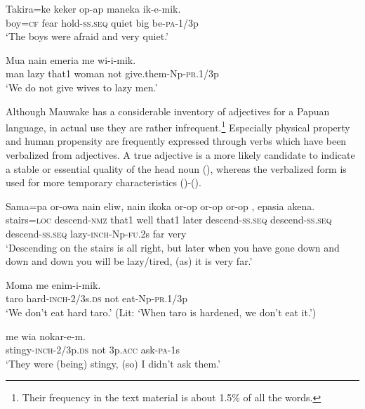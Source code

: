 \ea%
\label{ex:x1757}
\gll Takira=ke keker op-ap  maneka ik-e-mik. \\
boy=\textsc{cf} fear hold-\textsc{ss}.\textsc{seq} quiet big be-\textsc{pa}-1/3p\\
\glt`The boys were afraid and very quiet.'
\z

\ea%
\label{ex:x1418}
\gll Mua  nain emeria me wi-i-mik. \\
man lazy that1 woman not give.them-Np-\textsc{pr}.1/3p\\
\glt`We do not give wives to lazy men.'
\z

Although Mauwake has a considerable inventory of adjectives for a Papuan language, in actual use they are rather infrequent.\footnote{Their frequency in the text material is about 1.5\% of all the words.} Especially physical property and human propensity are frequently expressed through verbs which have been verbalized from adjectives. A true adjective is a more likely candidate to indicate a stable or essential quality of the head noun (), whereas the verbalized form is used for more temporary characteristics ()-().

\ea%
\label{ex:x1419}
\gll Sama=pa or-owa nain eliw, nain ikoka or-op or-op or-op , epasia akena.\\
stairs=\textsc{loc} descend-\textsc{nmz} that1 well that1 later descend-\textsc{ss}.\textsc{seq} descend-\textsc{ss}.\textsc{seq} descend-\textsc{ss}.\textsc{seq} lazy-\textsc{inch}-Np-\textsc{fu}.2s far very\\
\glt`Descending on the stairs is all right, but later when you have gone down and down and down you will be lazy/tired, (as) it is very far.'
\z

\ea%
\label{ex:x79}
\gll Moma   me enim-i-mik. \\
taro hard-\textsc{inch}-2/3s.\textsc{ds} not eat-Np-\textsc{pr}.1/3p\\
\glt`We don't eat hard taro.' (Lit: `When taro is hardened, we don't eat it.')
\z

\ea%
\label{ex:x80}
\gll {} me wia nokar-e-m. \\
stingy-\textsc{inch}-2/3p.\textsc{ds} not 3p.\textsc{acc} ask-\textsc{pa}-1s\\
\glt`They were (being) stingy, (so) I didn't ask them.'
\z

